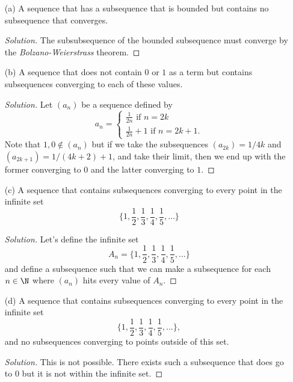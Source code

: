 \begin{enumerate}
    \item[(a)] A sequence that has a subsequence that is bounded but contains no subsequence that converges.
        \begin{proof}[Solution]
        The subsubsequence of the bounded subsequence must converge by the \textit{Bolzano-Weierstrass} theorem.
        \end{proof}
    \item[(b)] A sequence that does not contain \( 0 \) or \( 1\) as a term but contains subsequences converging to each of these values.
        \begin{proof}[Solution]
        Let \( (a_n)\) be a sequence defined by 
        \[ 
           a_n =  
            \begin{cases}
                \frac{1}{2n} \text{ if } n = 2k \\ 
                \frac{1}{2n} + 1 \text{ if } n = 2k + 1.
            \end{cases}
        \]
        Note that \( 1,0 \notin (a_n)\) but if we take the subsequences \( (a_{2k}) = 1 / 4k\) and \( (a_{2k+1}) = 1/(4k+2) + 1\), and take their limit, then we end up with the former converging to \( 0 \) and the latter converging to \( 1 \).

        \end{proof} 
    \item[(c)] A sequence that contains subsequences converging to every point in the infinite set 
        \[ \Big\{ 1 , \frac{1}{2} , \frac{1}{3}, \frac{1}{4}, \frac{1}{5},...\Big\}\]
        \begin{proof}[Solution]
         Let's define the infinite set  
         \[ A_n = \Big\{ 1, \frac{1}{2}, \frac{1}{3}, \frac{1}{4}, \frac{1}{5},... \Big\}\]
         and define a subsequence such that we can make a subsequence for each \( n \in \N \) where \( (a_n)\) hits every value of \( A_n\).
        \end{proof}
    \item[(d)] A sequence that contains subsequences converging to every point in the infinite set 
        \[ \Big\{1, \frac{1}{2}, \frac{1}{3}, \frac{1}{4}, \frac{1}{5},...\Big\},\]
        and no subsequences converging to points outside of this set.
        \begin{proof}[Solution]
          This is not possible. There exists such a subsequence that does go to \( 0 \) but it is not within the infinite set.
        \end{proof}
\end{enumerate}

